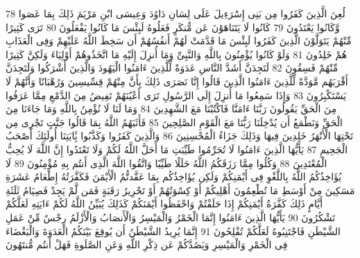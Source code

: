 \documentclass[20pt,a4paper]{article}
\begin{document}
{\tiny\colorbox{cl_aya}{78}} لُعِنَ الَّذِينَ كَفَرُوا مِن بَنِى إِسْرَءِيلَ عَلَى لِسَانِ دَاوُدَ وَعِيسَى ابْنِ مَرْيَمَ ذَلِكَ بِمَا عَصَوا وَّكَانُوا يَعْتَدُونَ
{\tiny\colorbox{cl_aya}{79}} كَانُوا لَا يَتَنَاهَوْنَ عَن مُّنكَرٍ فَعَلُوهُ لَبِئْسَ مَا كَانُوا يَفْعَلُونَ
{\tiny\colorbox{cl_aya}{80}} تَرَى كَثِيرًا مِّنْهُمْ يَتَوَلَّوْنَ الَّذِينَ كَفَرُوا لَبِئْسَ مَا قَدَّمَتْ لَهُمْ أَنفُسُهُمْ أَن سَخِطَ اللَّهُ عَلَيْهِمْ وَفِى الْعَذَابِ هُمْ خَلِدُونَ
{\tiny\colorbox{cl_aya}{81}} وَلَوْ كَانُوا يُؤْمِنُونَ بِاللَّهِ وَالنَّبِىِّ وَمَا أُنزِلَ إِلَيْهِ مَا اتَّخَذُوهُمْ أَوْلِيَاءَ وَلَكِنَّ كَثِيرًا مِّنْهُمْ فَسِقُونَ
{\tiny\colorbox{cl_aya}{82}} لَتَجِدَنَّ أَشَدَّ النَّاسِ عَدَوَةً لِّلَّذِينَ ءَامَنُوا الْيَهُودَ وَالَّذِينَ أَشْرَكُوا وَلَتَجِدَنَّ أَقْرَبَهُم مَّوَدَّةً لِّلَّذِينَ ءَامَنُوا الَّذِينَ قَالُوا إِنَّا نَصَرَى ذَلِكَ بِأَنَّ مِنْهُمْ قِسِّيسِينَ وَرُهْبَانًا وَأَنَّهُمْ لَا يَسْتَكْبِرُونَ
{\tiny\colorbox{cl_aya}{83}} وَإِذَا سَمِعُوا مَا أُنزِلَ إِلَى الرَّسُولِ تَرَى أَعْيُنَهُمْ تَفِيضُ مِنَ الدَّمْعِ مِمَّا عَرَفُوا مِنَ الْحَقِّ يَقُولُونَ رَبَّنَا ءَامَنَّا فَاكْتُبْنَا مَعَ الشَّهِدِينَ
{\tiny\colorbox{cl_aya}{84}} وَمَا لَنَا لَا نُؤْمِنُ بِاللَّهِ وَمَا جَاءَنَا مِنَ الْحَقِّ وَنَطْمَعُ أَن يُدْخِلَنَا رَبُّنَا مَعَ الْقَوْمِ الصَّلِحِينَ
{\tiny\colorbox{cl_aya}{85}} فَأَثَبَهُمُ اللَّهُ بِمَا قَالُوا جَنَّتٍ تَجْرِى مِن تَحْتِهَا الْأَنْهَرُ خَلِدِينَ فِيهَا وَذَلِكَ جَزَاءُ الْمُحْسِنِينَ
{\tiny\colorbox{cl_aya}{86}} وَالَّذِينَ كَفَرُوا وَكَذَّبُوا بَِٔايَتِنَا أُولَئِكَ أَصْحَبُ الْجَحِيمِ
{\tiny\colorbox{cl_aya}{87}} يَأَيُّهَا الَّذِينَ ءَامَنُوا لَا تُحَرِّمُوا طَيِّبَتِ مَا أَحَلَّ اللَّهُ لَكُمْ وَلَا تَعْتَدُوا إِنَّ اللَّهَ لَا يُحِبُّ الْمُعْتَدِينَ
{\tiny\colorbox{cl_aya}{88}} وَكُلُوا مِمَّا رَزَقَكُمُ اللَّهُ حَلَلًا طَيِّبًا وَاتَّقُوا اللَّهَ الَّذِى أَنتُم بِهِ مُؤْمِنُونَ
{\tiny\colorbox{cl_aya}{89}} لَا يُؤَاخِذُكُمُ اللَّهُ بِاللَّغْوِ فِى أَيْمَنِكُمْ وَلَكِن يُؤَاخِذُكُم بِمَا عَقَّدتُّمُ الْأَيْمَنَ فَكَفَّرَتُهُ إِطْعَامُ عَشَرَةِ مَسَكِينَ مِنْ أَوْسَطِ مَا تُطْعِمُونَ أَهْلِيكُمْ أَوْ كِسْوَتُهُمْ أَوْ تَحْرِيرُ رَقَبَةٍ فَمَن لَّمْ يَجِدْ فَصِيَامُ ثَلَثَةِ أَيَّامٍ ذَلِكَ كَفَّرَةُ أَيْمَنِكُمْ إِذَا حَلَفْتُمْ وَاحْفَظُوا أَيْمَنَكُمْ كَذَلِكَ يُبَيِّنُ اللَّهُ لَكُمْ ءَايَتِهِ لَعَلَّكُمْ تَشْكُرُونَ
{\tiny\colorbox{cl_aya}{90}} يَأَيُّهَا الَّذِينَ ءَامَنُوا إِنَّمَا الْخَمْرُ وَالْمَيْسِرُ وَالْأَنصَابُ وَالْأَزْلَمُ رِجْسٌ مِّنْ عَمَلِ الشَّيْطَنِ فَاجْتَنِبُوهُ لَعَلَّكُمْ تُفْلِحُونَ
{\tiny\colorbox{cl_aya}{91}} إِنَّمَا يُرِيدُ الشَّيْطَنُ أَن يُوقِعَ بَيْنَكُمُ الْعَدَوَةَ وَالْبَغْضَاءَ فِى الْخَمْرِ وَالْمَيْسِرِ وَيَصُدَّكُمْ عَن ذِكْرِ اللَّهِ وَعَنِ الصَّلَوةِ فَهَلْ أَنتُم مُّنتَهُونَ
\end{document}
